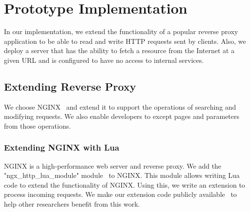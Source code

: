 \section{Prototype Implementation}
\label{sec:implementation}


In our implementation, we extend the functionality of a popular reverse proxy application to be able to read and write HTTP requests sent by clients. Also, we deploy a server that has the ability to fetch a resource from the Internet at a given URL and is configured to have no access to internal services.

\subsection{Extending Reverse Proxy}
We choose NGINX~\cite{nginx_website} and extend it to support the operations of searching and modifying requests. We also enable developers to except pages and parameters from those operations. 

\subsubsection{Extending NGINX with Lua}
NGINX is a high-performance web server and reverse proxy. We add the "ngx\_http\_lua\_module" module~\cite{openresty} to NGINX. This module allows writing Lua code to extend the functionality of NGINX. Using this, we write an extension to process incoming requests. We make our extension code publicly available~\cite{code-place} to help other researchers benefit from this work.


